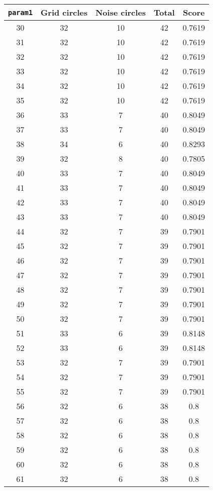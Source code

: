 \documentclass[letterpaper, 12pt]{article}
\begin{document}
\begin{longtable}{|c|c|c|c|c|}
\hline
\textbf{\texttt{param1}} & \textbf{Grid circles} & \textbf{Noise circles} & \textbf{Total} & \textbf{Score} \\
\hline
30 & 32 & 10 & 42 & 0.7619 \\
\hline
31 & 32 & 10 & 42 & 0.7619 \\
\hline
32 & 32 & 10 & 42 & 0.7619 \\
\hline
33 & 32 & 10 & 42 & 0.7619 \\
\hline
34 & 32 & 10 & 42 & 0.7619 \\
\hline
35 & 32 & 10 & 42 & 0.7619 \\
\hline
36 & 33 & 7 & 40 & 0.8049 \\
\hline
37 & 33 & 7 & 40 & 0.8049 \\
\hline
38 & 34 & 6 & 40 & 0.8293 \\
\hline
39 & 32 & 8 & 40 & 0.7805 \\
\hline
40 & 33 & 7 & 40 & 0.8049 \\
\hline
41 & 33 & 7 & 40 & 0.8049 \\
\hline
42 & 33 & 7 & 40 & 0.8049 \\
\hline
43 & 33 & 7 & 40 & 0.8049 \\
\hline
44 & 32 & 7 & 39 & 0.7901 \\
\hline
45 & 32 & 7 & 39 & 0.7901 \\
\hline
46 & 32 & 7 & 39 & 0.7901 \\
\hline
47 & 32 & 7 & 39 & 0.7901 \\
\hline
48 & 32 & 7 & 39 & 0.7901 \\
\hline
49 & 32 & 7 & 39 & 0.7901 \\
\hline
50 & 32 & 7 & 39 & 0.7901 \\
\hline
51 & 33 & 6 & 39 & 0.8148 \\
\hline
52 & 33 & 6 & 39 & 0.8148 \\
\hline
53 & 32 & 7 & 39 & 0.7901 \\
\hline
54 & 32 & 7 & 39 & 0.7901 \\
\hline
55 & 32 & 7 & 39 & 0.7901 \\
\hline
56 & 32 & 6 & 38 & 0.8 \\
\hline
57 & 32 & 6 & 38 & 0.8 \\
\hline
58 & 32 & 6 & 38 & 0.8 \\
\hline
59 & 32 & 6 & 38 & 0.8 \\
\hline
60 & 32 & 6 & 38 & 0.8 \\
\hline
61 & 32 & 6 & 38 & 0.8 \\

\end{longtable}
\end{document}
